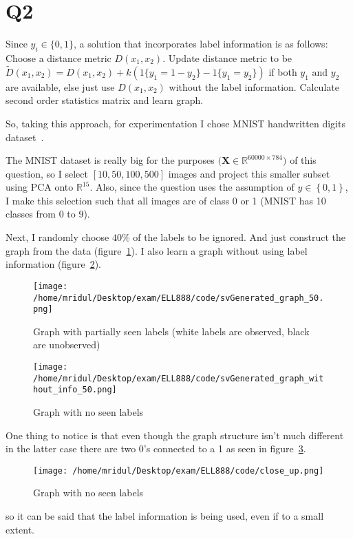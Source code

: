 \documentclass[11pt]{article}
\begin{document}
\section{Q2}
\label{sec:org1cffea9}
Since \(y_i\in\{0,1\}\), a solution that incorporates label
information is as follows:\\
Choose a distance metric \(D(x_1,x_2)\). Update distance metric to
be \(\tilde{D}(x_1,x_2)=D(x_1,x_2)+k(1\{y_1=1-y_2\}-1\{y_1=y_2\})\) if
both \(y_1\text{ and }y_2\) are available, else just use \(D(x_1,
x_2)\) without the label information. Calculate second order
statistics matrix and learn graph.\par
So, taking this approach, for experimentation I chose MNIST
handwritten digits dataset~\cite{MNIST}.\par
The MNIST dataset is really big for the purposes
\(\text{(}\mathbf{X}\in\mathbb{R}^{60000\times 784}\text{)}\) of this
question, so I select \([10,50,100,500]\) images and project this
smaller subset using PCA onto \(\mathbb{R}^15\). Also, since the
question uses the assumption of \(y\in\left\{0,1\right\}\), I make
this selection such that all images are of class 0 or 1 (MNIST has 10
classes from 0 to 9).\par
Next, I randomly choose \(40\%\) of the labels to be ignored. And just
construct the graph from the data (figure~\ref{fig:1}). I also learn a graph
without using label information (figure~\ref{fig:2}).
\begin{figure}[!h]
\centering
\texttt{[image: /home/mridul/Desktop/exam/ELL888/code/svGenerated\_graph\_50.png]}
\caption{Graph with partially seen labels (white labels are observed, black are unobserved)}
    \label{fig:1}
\end{figure}
\begin{figure}[!h]
\centering
\texttt{[image: /home/mridul/Desktop/exam/ELL888/code/svGenerated\_graph\_without\_info\_50.png]}
\caption{Graph with no seen labels}
    \label{fig:2}
\end{figure}
One thing to notice is that even though the graph structure isn't much
different in the latter case there are two 0's connected to a 1 as
seen in figure~\ref{fig:3}.
\begin{figure}[!h]
\centering
\texttt{[image: /home/mridul/Desktop/exam/ELL888/code/close\_up.png]}
\caption{Graph with no seen labels}
    \label{fig:3}
\end{figure}
so it can be said that the label information is being used, even if to
a small extent.
\clearpage
\end{document}
